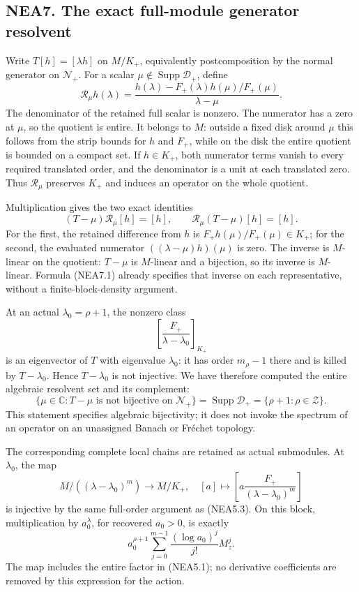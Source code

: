 \subsection{NEA7. The exact full-module generator
resolvent}\label{nea7.-the-exact-full-module-generator-resolvent}

Write \(T[h]=[\lambda h]\) on \(M/K_+\), equivalently postcomposition by
the normal generator on \(\mathscr N_+\). For a scalar
\(\mu\notin\operatorname{Supp}\mathscr D_+\), define \[
\mathcal R_\mu h(\lambda)=
\frac{h(\lambda)-F_+(\lambda)h(\mu)/F_+(\mu)}{\lambda-\mu}.
\tag{NEA7.1}
\] The denominator of the retained full scalar is nonzero. The numerator
has a zero at \(\mu\), so the quotient is entire. It belongs to \(M\):
outside a fixed disk around \(\mu\) this follows from the strip bounds
for \(h\) and \(F_+\), while on the disk the entire quotient is bounded
on a compact set. If \(h\in K_+\), both numerator terms vanish to every
required translated order, and the denominator is a unit at each
translated zero. Thus \(\mathcal R_\mu\) preserves \(K_+\) and induces
an operator on the whole quotient.

Multiplication gives the two exact identities \[
(T-\mu)\mathcal R_\mu[h]=[h],\qquad
\mathcal R_\mu(T-\mu)[h]=[h].
\tag{NEA7.2}
\] For the first, the retained difference from \(h\) is
\(F_+h(\mu)/F_+(\mu)\in K_+\); for the second, the evaluated numerator
\(((\lambda-\mu)h)(\mu)\) is zero. The inverse is \(M\)-linear on the
quotient: \(T-\mu\) is \(M\)-linear and a bijection, so its inverse is
\(M\)-linear. Formula (NEA7.1) already specifies that inverse on each
representative, without a finite-block-density argument.

At an actual \(\lambda_0=\rho+1\), the nonzero class \[
\left[\frac{F_+}{\lambda-\lambda_0}\right]_{K_+}
\tag{NEA7.3}
\] is an eigenvector of \(T\) with eigenvalue \(\lambda_0\): it has
order \(m_\rho-1\) there and is killed by \(T-\lambda_0\). Hence
\(T-\lambda_0\) is not injective. We have therefore computed the entire
algebraic resolvent set and its complement: \[
\{\mu\in\mathbb C:T-\mu\text{ is not bijective on }\mathscr N_+\}
=\operatorname{Supp}\mathscr D_+=\{\rho+1:\rho\in\mathscr Z\}.
\tag{NEA7.4}
\] This statement specifies algebraic bijectivity; it does not invoke
the spectrum of an operator on an unassigned Banach or Fréchet topology.

The corresponding complete local chains are retained as actual
submodules. At \(\lambda_0\), the map \[
M/((\lambda-\lambda_0)^m)\longrightarrow M/K_+,
\quad[a]\longmapsto\left[a\frac{F_+}{(\lambda-\lambda_0)^m}\right]
\tag{NEA7.5}
\] is injective by the same full-order argument as (NEA5.3). On this
block, multiplication by \(a_0^\lambda\), for recovered \(a_0>0\), is
exactly \[
a_0^{\rho+1}\sum_{j=0}^{m-1}\frac{(\log a_0)^j}{j!}M_z^j.
\tag{NEA7.6}
\] The map includes the entire factor in (NEA5.1); no derivative
coefficients are removed by this expression for the action.

